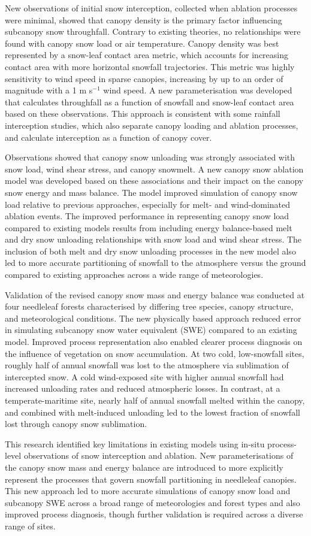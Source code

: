 {New observations of initial snow interception, collected when ablation processes were minimal, showed that canopy density is the primary factor influencing subcanopy snow throughfall. Contrary to existing theories, no relationships were found with canopy snow load or air temperature. Canopy density was best represented by a snow-leaf contact area metric, which accounts for increasing contact area with more horizontal snowfall trajectories. This metric was highly sensitivity to wind speed in sparse canopies, increasing by up to an order of magnitude with a 1 m s$^{-1}$ wind speed. A new parameterisation was developed that calculates throughfall as a function of snowfall and snow-leaf contact area based on these observations. This approach is consistent with some rainfall interception studies, which also separate canopy loading and ablation processes, and calculate interception as a function of canopy cover.

Observations showed that canopy snow unloading was strongly associated with snow load, wind shear stress, and canopy snowmelt. A new canopy snow ablation model was developed based on these associations and their impact on the canopy snow energy and mass balance. The model improved simulation of canopy snow load relative to previous approaches, especially for melt- and wind-dominated ablation events. The improved performance in representing canopy snow load compared to existing models results from including energy balance-based melt and dry snow unloading relationships with snow load and wind shear stress. The inclusion of both melt and dry snow unloading processes in the new model also led to more accurate partitioning of snowfall to the atmosphere versus the ground compared to existing approaches across a wide range of meteorologies.

Validation of the revised canopy snow mass and energy balance was conducted at four needleleaf forests characterised by differing tree species, canopy structure, and meteorological conditions. The new physically based approach reduced error in simulating subcanopy snow water equivalent (SWE) compared to an existing model. Improved process representation also enabled clearer process diagnosis on the influence of vegetation on snow accumulation. At two cold, low-snowfall sites, roughly half of annual snowfall was lost to the atmosphere via sublimation of intercepted snow. A cold wind-exposed site with higher annual snowfall had increased unloading rates and reduced atmospheric losses. In contrast, at a temperate-maritime site, nearly half of annual snowfall melted within the canopy, and combined with melt-induced unloading led to the lowest fraction of snowfall lost through canopy snow sublimation.

This research identified key limitations in existing models using in-situ process-level observations of snow interception and ablation. New parameterisations of the canopy snow mass and energy balance are introduced to more explicitly represent the processes that govern snowfall partitioning in needleleaf canopies. This new approach led to more accurate simulations of canopy snow load and subcanopy SWE across a broad range of meteorologies and forest types and also improved process diagnosis, though further validation is required across a diverse range of sites.
}
